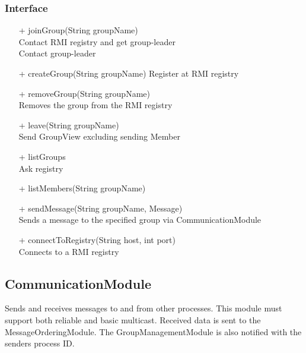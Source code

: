 \documentclass[english]{article}
\begin{document}
\subsubsection{Interface}
\begin{itemize}
\item[+]  joinGroup(String groupName) \\
	Contact RMI registry and get group-leader \\
	Contact group-leader

\item[+]  createGroup(String groupName)
	Register at RMI registry

\item[+]  removeGroup(String groupName) \\
	Removes the group from the RMI registry

\item[+] leave(String groupName) \\
	Send GroupView excluding sending Member

\item[+]  listGroups \\
	Ask registry

\item[+]  listMembers(String groupName)

\item[+]  sendMessage(String groupName, Message) \\
	Sends a message to the specified group via CommunicationModule

\item[+]  connectToRegistry(String host, int port) \\
	Connects to a RMI registry
\end{itemize}

\subsection{CommunicationModule}
Sends and receives messages to and from other processes. This module must support both reliable and basic multicast. Received data is sent to the MessageOrderingModule. The GroupManagementModule is also notified with the senders process ID. 
\end{document}
